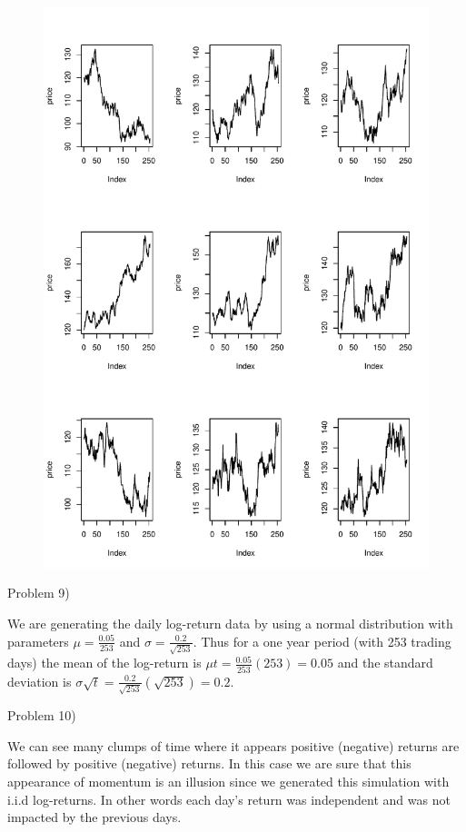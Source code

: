 \documentclass[
  letterpaper,
  DIV=11,
  numbers=noendperiod]{scrartcl}
\begin{document}
\begin{figure}[H]

{\centering \includegraphics{homework_1_files/figure-pdf/unnamed-chunk-1-1.pdf}

}

\end{figure}

Problem 9)

We are generating the daily log-return data by using a normal
distribution with parameters \(\mu=\frac{0.05}{253}\) and
\(\sigma=\frac{0.2}{\sqrt{253}}\). Thus for a one year period (with 253
trading days) the mean of the log-return is
\(\mu t=\frac{0.05}{253}(253)=0.05\) and the standard deviation is
\(\sigma\sqrt{t}=\frac{0.2}{\sqrt{253}}(\sqrt{253})=0.2\).

Problem 10)

We can see many clumps of time where it appears positive (negative)
returns are followed by positive (negative) returns. In this case we are
sure that this appearance of momentum is an illusion since we generated
this simulation with i.i.d log-returns. In other words each day's return
was independent and was not impacted by the previous days.
\end{document}
